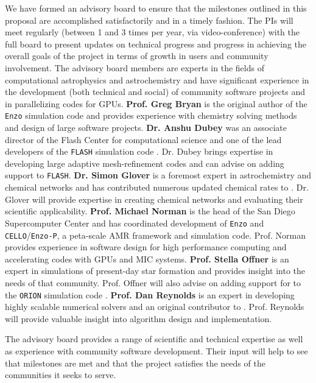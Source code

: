 We have formed an advisory board to ensure that the milestones
outlined in this proposal are accomplished satisfactorily and in a timely
fashion.  The PIs will meet regularly (between 1 and 3 times
per year, via video-conference) with the full board to present updates
on technical progress and progress in achieving the overall goals of
the project in terms of growth in users and community involvement.  The
advisory board members are experts in the fields of computational
astrophysics and astrochemistry and have significant experience in the
development (both technical and social) of community software projects
and in parallelizing codes for GPUs.
{\bf Prof. Greg Bryan} is the original author of the \texttt{Enzo}
simulation code and provides experience with chemistry solving methods
and design of large software projects.
{\bf Dr. Anshu Dubey} was an associate director of the Flash Center
for computational science and one of the lead developers of the
\texttt{FLASH} simulation code \citep{2000ApJS..131..273F,
  2009arXiv0903.4875D}.  Dr. Dubey brings expertise in developing
large adaptive mesh-refinement codes and can advise on adding
\grackle{} support to \texttt{FLASH}.
{\bf Dr. Simon Glover} is a foremost expert in astrochemistry and
chemical networks and has contributed numerous updated chemical rates to
\grackle{}.  Dr. Glover will provide expertise in creating chemical
networks and evaluating their scientific applicability.
{\bf Prof. Michael Norman} is the head of the San Diego Supercomputer
Center and has coordinated development of \texttt{Enzo} and
\texttt{CELLO}/\texttt{Enzo-P}, a peta-scale AMR framework and
simulation code.  Prof. Norman provides experience in software design for
high performance computing and accelerating codes with GPUs and MIC
systems.
{\bf Prof. Stella Offner} is an expert in simulations of present-day
star formation and provides insight into the needs of that community.
Prof. Offner will also advise on adding support for \grackle{} to the
\texttt{ORION} simulation code \citep{2012ApJ...745..139L}.
{\bf Prof. Dan Reynolds} is an expert in developing highly scalable
numerical solvers and an original contributor to \dengo{}.
Prof. Reynolds will provide valuable insight into algorithm design and
implementation.

The advisory board provides a range of scientific and technical
expertise as well as experience with community software development.
Their input will help to see that milestones are met and that
the project satisfies the needs of the communities it seeks to serve.
